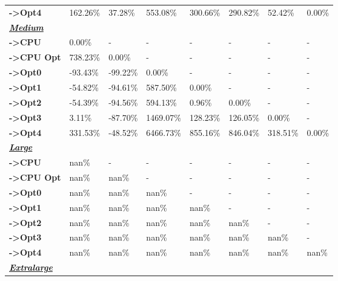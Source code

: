 \begin{table}[H]
\begin{tabular}{llllllll}
    \rowcolor[HTML]{EFEFEF} \cellcolor[HTML]{DAE8FC} \textbf{->Opt4} & 162.26\% & 37.28\% & 553.08\% & 300.66\% & 290.82\% & 	52.42\% & 	0.00\% \\
    \cellcolor[HTML]{DAE8FC} \textbf{\textbf{{\emph{{\underline{{Medium}}}}}}} &  &  &  &  &  &  &  \\
    \rowcolor[HTML]{EFEFEF} \cellcolor[HTML]{DAE8FC} \textbf{->CPU} & 0.00\% & - & - & - & - & - & - \\
    \cellcolor[HTML]{DAE8FC} \textbf{->CPU Opt} & 738.23\% & 0.00\% & - & - & - & - & - \\
    \rowcolor[HTML]{EFEFEF} \cellcolor[HTML]{DAE8FC} \textbf{->Opt0} & -93.43\% & -99.22\% & 0.00\% & - & - & - & - \\
    \cellcolor[HTML]{DAE8FC} \textbf{->Opt1} & -54.82\% & -94.61\% & 587.50\% & 0.00\% & - & - & - \\
    \rowcolor[HTML]{EFEFEF} \cellcolor[HTML]{DAE8FC} \textbf{->Opt2} & -54.39\% & -94.56\% & 594.13\% & 0.96\% & 0.00\% & - & - \\
    \cellcolor[HTML]{DAE8FC} \textbf{->Opt3} & 3.11\% & -87.70\% & 1469.07\% & 128.23\% & 126.05\% & 	0.00\% & - \\
    \rowcolor[HTML]{EFEFEF} \cellcolor[HTML]{DAE8FC} \textbf{->Opt4} & 331.53\% & -48.52\% & 6466.73\% & 855.16\% & 846.04\% & 	318.51\% & 	0.00\% \\
    \cellcolor[HTML]{DAE8FC} \textbf{\textbf{{\emph{{\underline{{Large}}}}}}} &  &  &  &  &  &  &  \\
    \rowcolor[HTML]{EFEFEF} \cellcolor[HTML]{DAE8FC} \textbf{->CPU} & nan\% & - & - & - & - & - & - \\
    \cellcolor[HTML]{DAE8FC} \textbf{->CPU Opt} & nan\% & nan\% & - & - & - & - & - \\
    \rowcolor[HTML]{EFEFEF} \cellcolor[HTML]{DAE8FC} \textbf{->Opt0} & nan\% & nan\% & nan\% & - & - & - & - \\
    \cellcolor[HTML]{DAE8FC} \textbf{->Opt1} & nan\% & nan\% & nan\% & nan\% & - & - & - \\
    \rowcolor[HTML]{EFEFEF} \cellcolor[HTML]{DAE8FC} \textbf{->Opt2} & nan\% & nan\% & nan\% & nan\% & nan\% & - & - \\
    \cellcolor[HTML]{DAE8FC} \textbf{->Opt3} & nan\% & nan\% & nan\% & nan\% & nan\% & 	nan\% & - \\
    \rowcolor[HTML]{EFEFEF} \cellcolor[HTML]{DAE8FC} \textbf{->Opt4} & nan\% & nan\% & nan\% & nan\% & nan\% & 	nan\% & 	nan\% \\
    \cellcolor[HTML]{DAE8FC} \textbf{\textbf{{\emph{{\underline{{Extralarge}}}}}}} &  &  &  &  &  &  &  \\

\end{tabular}
\end{table}
